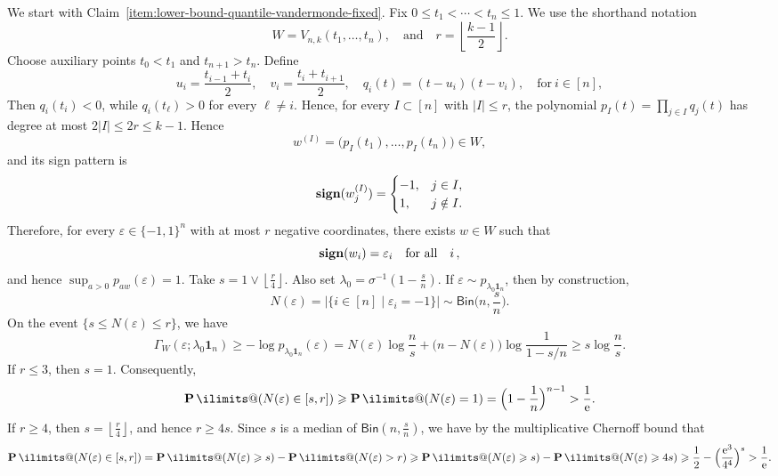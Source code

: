 \documentclass[11pt, letterpaper, hidelinks]{article}
\makeatletter
\newcommand{\twomax}[2]{\ensuremath{#1 \lor #2}}
\newcommand{\floor}[1]{\left\lfloor #1 \right\rfloor}
\newcommand{\e}{\mathrm{e}}
\DeclareMathOperator{\sign}{\bf sign}
\newcommand{\1}{\mathbf 1}
\newcommand{\eps}{\varepsilon}
\renewcommand{\le}{\leqslant}
\renewcommand{\ge}{\geqslant}
\renewcommand{\leq}{\leqslant}
\renewcommand{\geq}{\geqslant}
\renewcommand{\P}{\operatorname*{\mathbf{P}}\ilimits@}
\theoremstyle{plain}
\theoremstyle{definition}
\newcommand{\defn}{=}
\makeatother
\begin{document}
We start with Claim~\ref{item:lower-bound-quantile-vandermonde-fixed}.
Fix $0\le t_1<\cdots<t_n\le 1$. We 
use the shorthand notation
\[
W \defn V_{n,k}(t_1,\dots,t_n),
\quad \mbox{and} \quad
r \defn \floor{\frac{k-1}{2}}.
\]
Choose auxiliary points $t_0 < t_1$ and $t_{n+1} > t_n$.
Define 
\[
u_i \defn \frac{t_{i-1}+t_i}{2},\quad 
v_i \defn \frac{t_i+t_{i+1}}{2}, \quad 
q_i(t)\defn (t-u_i)(t-v_i), \quad 
\mbox{for}~i\in[n],
\]
Then $q_i(t_i)<0$, while $q_i(t_\ell)>0$ for every $\ell\neq i$. Hence, for every
$I\subset[n]$ with $|I|\le r$, the polynomial 
$p_I(t)\defn \prod_{j\in I} q_j(t)$ 
has degree at most $2|I|\le 2r\le k-1$. 
Hence 
\[
w^{(I)}\defn \bigl(p_I(t_1),\dots,p_I(t_n)\bigr)\in W,
\]
and its sign pattern is
\begin{equation}
\sign(w^{(I)}_j)=
\begin{cases}
-1,& j\in I,\\
 1,& j\notin I.
\end{cases}
\end{equation}
Therefore, for every $\eps\in\{-1,1\}^n$ with at most $r$ negative coordinates, there exists
$w\in W$ such that
\begin{equation}
\label{eq:achievable-sign-pattern}
\sign(w_i)=\eps_i \quad	\text{for all} \quad i \, ,
\end{equation}
and hence
$\sup_{a>0} p_{aw}(\eps)=1$. Take $s \defn \twomax{1}{\floor{\frac{r}{4}}}$.
Also set $\lambda_0 = \sigma^{-1}(1-\tfrac{s}{n})$.
If $\eps\sim p_{\lambda_0\1_n}$, then by construction, 
\[
N(\eps) = \left|\Big\{i\in[n] \mid \eps_i=-1\Big\}\right| \sim 
\mathsf{Bin}\Big(n,\frac{s}{n}\Big).
\]
On the event $\{s\leq N(\eps)\leq r\}$, we have 
\[
\Gamma_W(\eps;\lambda_0\1_n)
\ge -\log p_{\lambda_0\1_n}(\eps)
= N(\eps)\log\frac ns + \bigl(n-N(\eps)\bigr)\log\frac{1}{1-s/n}
\ge s\log\frac ns.
\]
If $r \leq 3$, then $s=1$. Consequently, 
\begin{equation}
\label{eq:bin-event-small-r}
\P( N(\eps) \in [s, r]) 
	\geq \P( N(\eps) = 1) 
	= \Big(1-\frac{1}{n}\Big)^{n-1}
	> \frac{1}{\e}.
\end{equation}
If $r \geq 4$, then $s = \floor{\tfrac{r}{4}}$, and hence $r \geq 4s$.
Since $s$ is a median of $\mathsf{Bin}(n, \tfrac{s}{n})$,
we have by the multiplicative Chernoff bound that  
\begin{equation}
\label{eq:bin-event-large-r}
\P(N(\eps)\in [s, r])
	= \P(N(\eps) \geq s) - \P(N(\eps) > r)
	\geq \P(N(\eps) \geq s) - \P(N(\eps)\geq 4s)
	\geq \frac{1}{2} - \Bigl(\frac{\e^3}{4^4}\Bigr)^s > \frac{1}{\e}. 
\end{equation}
\end{document}
